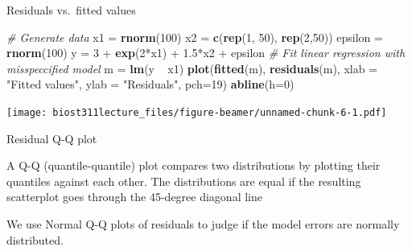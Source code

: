 \documentclass[12pt,ignorenonframetext,]{beamer}
\newenvironment{Shaded}{\begin{snugshade}}{\end{snugshade}}
\newcommand{\KeywordTok}[1]{\textcolor[rgb]{0.13,0.29,0.53}{\textbf{{#1}}}}
\newcommand{\DataTypeTok}[1]{\textcolor[rgb]{0.13,0.29,0.53}{{#1}}}
\newcommand{\DecValTok}[1]{\textcolor[rgb]{0.00,0.00,0.81}{{#1}}}
\newcommand{\FloatTok}[1]{\textcolor[rgb]{0.00,0.00,0.81}{{#1}}}
\newcommand{\StringTok}[1]{\textcolor[rgb]{0.31,0.60,0.02}{{#1}}}
\newcommand{\CommentTok}[1]{\textcolor[rgb]{0.56,0.35,0.01}{\textit{{#1}}}}
\newcommand{\NormalTok}[1]{{#1}}
\begin{document}
\begin{frame}[fragile]{Residuals vs.~fitted values}

\tiny

\begin{Shaded}
\begin{Highlighting}[]
\CommentTok{# Generate data}
\NormalTok{x1 =}\StringTok{ }\KeywordTok{rnorm}\NormalTok{(}\DecValTok{100}\NormalTok{)}
\NormalTok{x2 =}\StringTok{ }\KeywordTok{c}\NormalTok{(}\KeywordTok{rep}\NormalTok{(}\DecValTok{1}\NormalTok{, }\DecValTok{50}\NormalTok{), }\KeywordTok{rep}\NormalTok{(}\DecValTok{2}\NormalTok{,}\DecValTok{50}\NormalTok{))}
\NormalTok{epsilon =}\StringTok{ }\KeywordTok{rnorm}\NormalTok{(}\DecValTok{100}\NormalTok{) }
\NormalTok{y =}\StringTok{ }\DecValTok{3} \NormalTok{+}\StringTok{ }\KeywordTok{exp}\NormalTok{(}\DecValTok{2}\NormalTok{*x1) +}\StringTok{ }\FloatTok{1.5}\NormalTok{*x2 +}\StringTok{ }\NormalTok{epsilon}
\CommentTok{# Fit linear regression with misspeccified model}
\NormalTok{m =}\StringTok{ }\KeywordTok{lm}\NormalTok{(y ~}\StringTok{ }\NormalTok{x1)}
\KeywordTok{plot}\NormalTok{(}\KeywordTok{fitted}\NormalTok{(m), }\KeywordTok{residuals}\NormalTok{(m), }\DataTypeTok{xlab =} \StringTok{"Fitted values"}\NormalTok{, }\DataTypeTok{ylab =} \StringTok{"Residuals"}\NormalTok{, }\DataTypeTok{pch=}\DecValTok{19}\NormalTok{)}
\KeywordTok{abline}\NormalTok{(}\DataTypeTok{h=}\DecValTok{0}\NormalTok{)}
\end{Highlighting}
\end{Shaded}

\texttt{[image: biost311lecture\_files/figure-beamer/unnamed-chunk-6-1.pdf]}

\normalsize

\end{frame}

\begin{frame}{Residual Q-Q plot}

A Q-Q (quantile-quantile) plot compares two distributions by plotting
their quantiles against each other. The distributions are equal if the
resulting scatterplot goes through the 45-degree diagonal line

We use Normal Q-Q plots of residuals to judge if the model errors are
normally distributed.

\end{frame}
\end{document}
